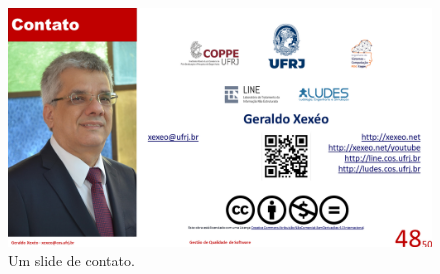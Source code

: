 \begin{figure}[h]
    \centering
    \includegraphics[width=\tam\linewidth,frame]{imagens/fim.png}
    \caption{Um slide de contato.}
    \label{fig:fim}
\end{figure}
